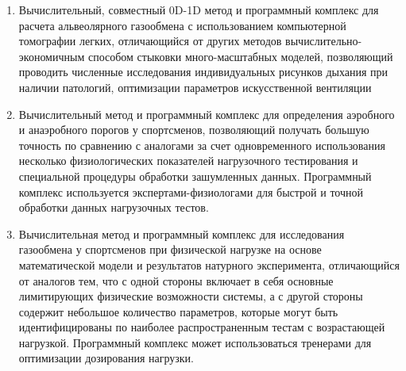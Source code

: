 \begin{enumerate}
 \item
 Вычислительный, совместный 0D-1D метод и программный комплекс для расчета альвеолярного газообмена с использованием компьютерной томографии легких, отличающийся от других методов вычислительно-экономичным способом стыковки много-масштабных моделей, позволяющий проводить численные исследования индивидуальных рисунков дыхания при наличии патологий, оптимизации параметров искусственной вентиляции 
 \item
 Вычислительный метод и программный комплекс для определения аэробного и анаэробного порогов у спортсменов, позволяющий получать большую точность по сравнению с аналогами за счет одновременного использования несколько физиологических показателей нагрузочного тестирования и специальной процедуры обработки зашумленных данных. Программный комплекс используется экспертами-физиологами для быстрой и точной обработки данных нагрузочных тестов.
 \item
 Вычислительная метод и программный комплекс для исследования газообмена у спортсменов при физической нагрузке на основе математической модели и результатов натурного эксперимента, отличающийся от аналогов тем, что с одной стороны включает в себя основные лимитирующих физические возможности системы, а с другой стороны содержит небольшое количество параметров, которые могут быть идентифицированы по наиболее распространенным тестам с возрастающей нагрузкой. Программный комплекс может использоваться тренерами для оптимизации дозирования нагрузки.   
   
\end{enumerate}

